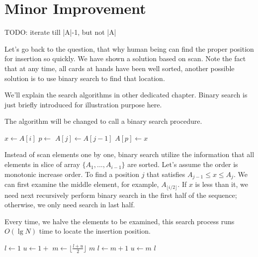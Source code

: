 \documentclass{article}
\begin{document}

\section{Minor Improvement}

TODO: iterate till |A|-1, but not |A|

Let's go back to the question, that why human being can find the proper
position for insertion so quickly. We have shown a solution based on scan.
Note the fact that at any time, all cards at hands have been well sorted,
another possible solution is to use binary search to find that location.

We'll explain the search algorithms in other dedicated chapter. Binary
search is just briefly introduced for illustration purpose here.

The algorithm will be changed to call a binary search procedure.

\begin{algorithmic}
    \State $x \gets A[i]$
    \State $p \gets $ 
      \State $A[j] \gets A[j-1]$
    \EndFor
    \State $A[p] \gets x$
  \EndFor
\EndFunction
\end{algorithmic}

Instead of scan elements one by one, binary search utilize the information
that all elements in slice of array $\{A_1, ..., A_{i-1} \}$ are sorted. 
Let's assume
the order is monotonic increase order. To find a position $j$ that satisfies
$A_{j-1} \leq x \leq A_{j}$. We can first examine the middle element, for 
example, $A_{\lfloor i/2 \rfloor}$. If $x$ is less than it, we need next recursively
perform binary search in the first half of the sequence; otherwise, we
only need search in last half.

Every time, we halve the elements to be examined, this search process runs
$O(\lg N)$ time to locate the insertion position.

\begin{algorithmic}
  \State $l \gets 1$
  \State $u \gets 1+$ 
    \State $m \gets \lfloor \frac{l+u}{2} \rfloor$
      \State \Return $m$ 
      \State $l \gets m+1$
    \Else
      \State $u \gets m$
    \EndIf
  \EndWhile
  \State \Return $l$
\EndFunction
\end{algorithmic}
\end{document}
